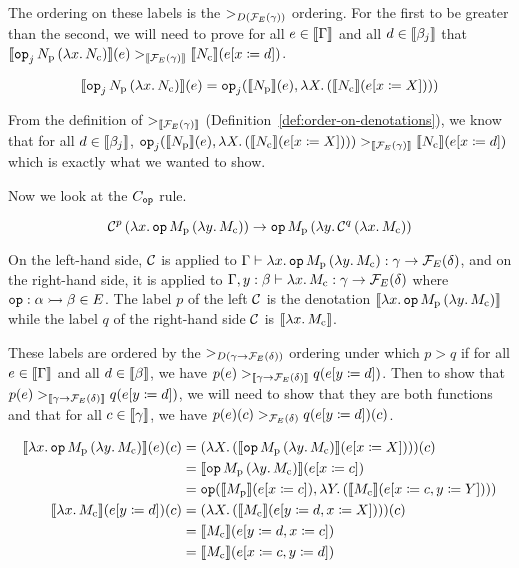 The ordering on these labels is the $>_{D(\mathcal{F}_E(\gamma))}$ ordering. For
the first to be greater than the second, we will need to prove for all
$e \in \llbracket \Gamma \rrbracket$ and all $d \in \llbracket \beta_j \rrbracket$ that
$\llbracket \mathtt{op}_j\,N_{\mathrm{p}}\,(\lambda x.\, N_{\mathrm{c}}) \rrbracket(e)
>_{\llbracket \mathcal{F}_E(\gamma) \rrbracket} \llbracket N_{\mathrm{c}} \rrbracket(e[x \coloneqq d])$.

$$
\llbracket \mathtt{op}_j\,N_{\mathrm{p}}\,(\lambda x.\, N_{\mathrm{c}}) \rrbracket(e) =
\mathtt{op}_j(\llbracket N_{\mathrm{p}} \rrbracket(e), \lambda X.\, ({\llbracket N_{\mathrm{c}} \rrbracket}(e[x \coloneqq X])))
$$

From the definition of $>_{\llbracket \mathcal{F}_E(\gamma) \rrbracket}$
(Definition~\ref{def:order-on-denotations}), we know that for all
$d \in \llbracket \beta_j \rrbracket$,
$\mathtt{op}_j(\llbracket N_{\mathrm{p}} \rrbracket(e), \lambda X.\, ({\llbracket N_{\mathrm{c}} \rrbracket}(e[x \coloneqq X])))
>_{\llbracket \mathcal{F}_E(\gamma) \rrbracket} \llbracket N_{\mathrm{c}} \rrbracket(e[x \coloneqq d])$ which is exactly
what we wanted to show.

Now we look at the $C_{\mathtt{op}}$ rule.

$$
\mathcal{C}^p\,(\lambda x.\, \mathtt{op}\,M_{\mathrm{p}}\,(\lambda y.\, M_{\mathrm{c}}))
\to \mathtt{op}\,M_{\mathrm{p}}\,(\lambda y.\, \mathcal{C}^q\,(\lambda x.\, M_{\mathrm{c}}))
$$

On the left-hand side, $\mathcal{C}$ is applied to
$\Gamma \vdash \lambda x.\, \mathtt{op}\,M_{\mathrm{p}}\,(\lambda y.\, M_{\mathrm{c}}) :
\gamma \to \mathcal{F}_E(\delta)$, and on the right-hand side, it is applied to
$\Gamma, y : \beta \vdash \lambda x.\, M_{\mathrm{c}} : \gamma \to \mathcal{F}_E(\delta)$
where $\mathtt{op} : \alpha \rightarrowtail \beta \in E$. The label $p$ of the left $\mathcal{C}$
is the denotation
$\llbracket \lambda x.\, \mathtt{op}\,M_{\mathrm{p}}\,(\lambda y.\, M_{\mathrm{c}}) \rrbracket$ while the
label $q$ of the right-hand side $\mathcal{C}$ is $\llbracket \lambda x.\, M_{\mathrm{c}} \rrbracket$.

These labels are ordered by the $>_{D(\gamma \to \mathcal{F}_E(\delta))}$ ordering
under which $p > q$ if for all $e \in \llbracket \Gamma \rrbracket$ and all
$d \in \llbracket \beta \rrbracket$, we have
$p(e) >_{\llbracket \gamma \to \mathcal{F}_E(\delta) \rrbracket} q(e[y \coloneqq d])$. Then to show
that $p(e) >_{\llbracket \gamma \to \mathcal{F}_E(\delta) \rrbracket} q(e[y \coloneqq d])$, we will
need to show that they are both functions and that for all
$c \in \llbracket \gamma \rrbracket$, we have
$p(e)(c) >_{\mathcal{F}_E(\delta)} q(e[y \coloneqq d])(c)$.

\begin{align*}
  \llbracket \lambda x.\, \mathtt{op}\,M_{\mathrm{p}}\,(\lambda y.\, M_{\mathrm{c}}) \rrbracket(e)(c)
  &= (\lambda X.\, (\llbracket \mathtt{op}\,M_{\mathrm{p}}\,(\lambda y.\, M_{\mathrm{c}}) \rrbracket(e[x \coloneqq X])))(c) \\
  &= \llbracket \mathtt{op}\,M_{\mathrm{p}}\,(\lambda y.\, M_{\mathrm{c}}) \rrbracket(e[x \coloneqq c]) \\
  &= \mathtt{op}(\llbracket M_{\mathrm{p}} \rrbracket(e[x \coloneqq c]), \lambda Y.\, (\llbracket M_{\mathrm{c}} \rrbracket(e[x \coloneqq c, y \coloneqq Y]))) \\
  \llbracket \lambda x.\, M_{\mathrm{c}} \rrbracket(e[y \coloneqq d])(c)
  &= (\lambda X.\, (\llbracket M_{\mathrm{c}} \rrbracket(e[y \coloneqq d, x \coloneqq X])))(c) \\
  &= \llbracket M_{\mathrm{c}} \rrbracket(e[y \coloneqq d, x \coloneqq c]) \\
  &= \llbracket M_{\mathrm{c}} \rrbracket(e[x \coloneqq c, y \coloneqq d])
\end{align*}


